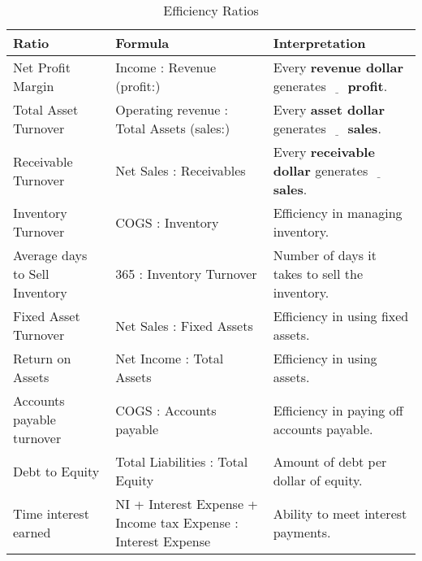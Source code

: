 \begin{table}[h]
    \centering
    \caption{Efficiency Ratios}
    \label{tab:other_financial_ratios}
    \begin{tabular}{|p{}|p{}|p{}|}
        \hline
        \textbf{Ratio}                 & \textbf{Formula}                                              & \textbf{Interpretation}                                                               \\
        \hline
        Net Profit Margin              & Income : Revenue (profit:)                                    & Every \textbf{revenue dollar} generates $\underline{\hspace{1em}}$ \textbf{profit}.   \\
        \hline
        Total Asset Turnover           & Operating revenue : Total Assets (sales:)                     & Every \textbf{asset dollar} generates $\underline{\hspace{1em}}$ \textbf{sales}.      \\
        \hline
        Receivable Turnover            & Net Sales : Receivables                                       & Every \textbf{receivable dollar} generates $\underline{\hspace{1em}}$ \textbf{sales}. \\
        \hline
        Inventory Turnover             & COGS : Inventory                                              & Efficiency in managing inventory.                                                     \\
        \hline
        Average days to Sell Inventory & 365 : Inventory Turnover                                      & Number of days it takes to sell the inventory.                                        \\
        \hline
        Fixed Asset Turnover           & Net Sales : Fixed Assets                                      & Efficiency in using fixed assets.                                                     \\
        \hline
        Return on Assets               & Net Income : Total Assets                                     & Efficiency in using assets.                                                           \\
        \hline
        Accounts payable turnover      & COGS : Accounts payable                                       & Efficiency in paying off accounts payable.                                            \\
        \hline
        Debt to Equity                 & Total Liabilities : Total Equity                              & Amount of debt per dollar of equity.                                                  \\
        \hline
        Time interest earned           & NI + Interest Expense + Income tax Expense : Interest Expense & Ability to meet interest payments.                                                    \\
        \hline
    \end{tabular}
\end{table}

